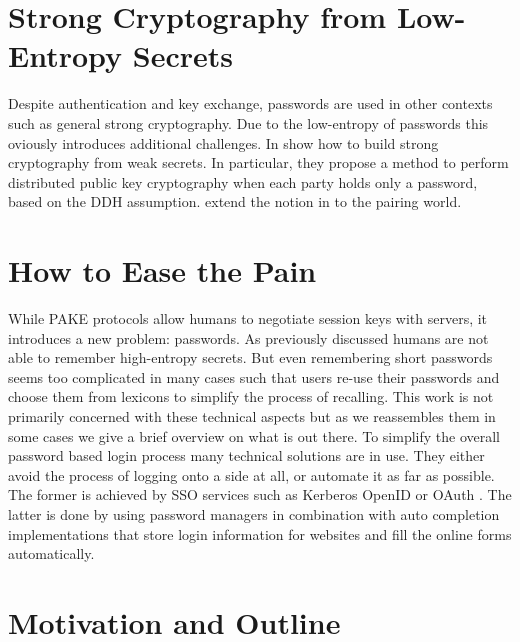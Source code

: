\section{Strong Cryptography from Low-Entropy Secrets}
Despite authentication and key exchange, passwords are used in other contexts such as general strong cryptography.
Due to the low-entropy of passwords this oviously introduces additional challenges.
In \cite{AbdallaBCP09} \citeauthor{AbdallaBCP09} show how to build strong cryptography from weak secrets.
In particular, they propose a method to perform distributed public key cryptography when each party holds only a password, based on the \acl{DDH} assumption.
\citeauthor{BoyenCFP10} extend the notion in \cite{BoyenCFP10} to the pairing world.


\section{How to Ease the Pain}
While \ac{PAKE} protocols allow humans to negotiate session keys with servers, it introduces a new problem: passwords.
As previously discussed humans are not able to remember high-entropy secrets.
But even remembering short passwords seems too complicated in many cases such that users re-use their passwords and choose them from lexicons to simplify the process of recalling.
This work is not primarily concerned with these technical aspects but as we reassembles them in some cases we give a brief overview on what is out there.
To simplify the overall password based login process many technical solutions are in use.
They either avoid the process of logging onto a side at all, or automate it as far as possible.
The former is achieved by \ac{SSO} services such as Kerberos \cite{rfc4120} OpenID \cite{OpenID} or OAuth \cite{rfc6749}.
The latter is done by using password managers in combination with auto completion implementations that store login information for websites and fill the online forms automatically.


\section{Motivation and Outline}

